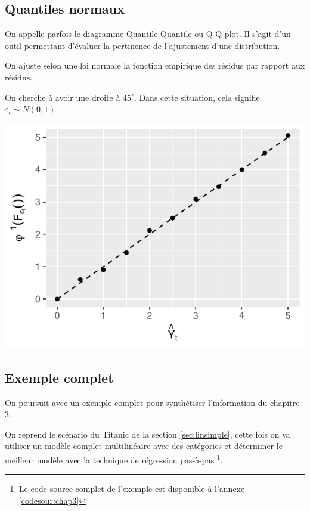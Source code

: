 \documentclass[11pt,french]{report}
\begin{document}
\subsection{Quantiles normaux}
On appelle parfois le diagramme Quantile-Quantile ou Q-Q plot. Il s'agit d'un outil permettant d'évaluer la pertinence de l'ajustement d'une distribution. \newline

On ajuste selon une loi normale la fonction empirique des résidus par rapport aux résidus. \newline

On cherche à avoir une droite à $45^\circ$. Dans cette situation, cela signifie $\varepsilon_t \sim N(0,1)$.

\includegraphics{notes_de_cours-034}

\subsection{Exemple complet}
\label{ex:chapitre3}

On poursuit avec un exemple complet pour synthétiser l'information du chapitre 3. \newline

On reprend le scénario du Titanic de la section \ref{sec:linsimple}, cette fois on va utiliser un modèle complet multilinéaire avec des catégories et déterminer le meilleur modèle avec la technique de régression pas-à-pas \footnote{Le code source complet de l'exemple est disponible à l'annexe \ref{codesour:chap3}}.  \newline
\end{document}
